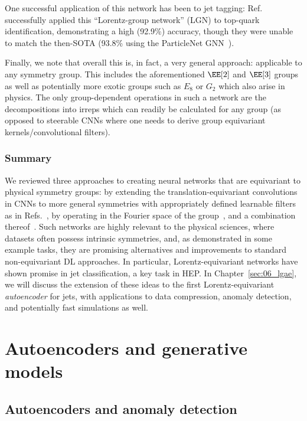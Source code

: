 One successful application of this network has been to jet tagging:
Ref.~\cite{bogatskiy2020lorentz} successfully applied this ``Lorentz-group network'' (LGN) to top-quark identification, demonstrating a high (92.9\%) accuracy, though they were unable to match the then-SOTA (93.8\% using the ParticleNet GNN~\cite{Qu:2019gqs}).

Finally, we note that overall this is, in fact, a very general approach: applicable to any symmetry group.
This includes the aforementioned $\EE[2]$ and $\EE[3]$ groups as well as potentially more exotic groups such as $E_8$ or $G_2$ which also arise in physics.
The only group-dependent operations in such a network are the decompositions into irreps which can readily be calculated for any group (as opposed to steerable CNNs where one needs to derive group equivariant kernels/convolutional filters).

\subsubsection{Summary}
\label{sec:06_equivariantnns_conclusion}

We reviewed three approaches to creating neural networks that are equivariant to physical symmetry groups: by extending the translation-equivariant convolutions in CNNs to more general symmetries with appropriately defined learnable filters as in Refs.~\cite{equivariance-kernel-Cohen,equivariance-kernel-Finzi,cohen2016group}, by operating in the Fourier space of the group~\cite{bogatskiy2020lorentz}, and a combination thereof~\cite{thomas2018tensor}.
Such networks are highly relevant to the physical sciences, where datasets often possess intrinsic symmetries, and, as demonstrated in some example tasks, they are promising alternatives and improvements to standard non-equivariant DL approaches.
In particular, Lorentz-equivariant networks have shown promise in jet classification, a key task in HEP.
In Chapter~\ref{sec:06_lgae}, we will discuss the extension of these ideas to the first Lorentz-equivariant \textit{autoencoder} for jets, with applications to data compression, anomaly detection, and potentially fast simulations as well.


\section{Autoencoders and generative models}
\label{sec:03_genaes}

\subsection{Autoencoders and anomaly detection}
\label{sec:03_aes}

